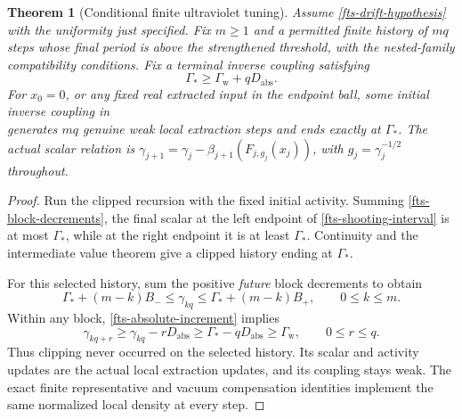 \documentclass[11pt]{article}
\newtheorem{theorem}{Theorem}[section]
\theoremstyle{remark}
\begin{document}
\begin{theorem}[Conditional finite ultraviolet tuning]
\label{fts-theorem}
Assume \eqref{fts-drift-hypothesis} with the uniformity just
specified. Fix $m\geq1$ and a permitted finite history of
$mq$ steps whose final period is above the strengthened
threshold, with the nested-family compatibility conditions.
Fix a terminal inverse coupling satisfying
\begin{equation}
       \Gamma_*\geq\Gamma_{\mathrm w}+qD_{\mathrm{abs}}.
 \label{fts-terminal-margin}
\end{equation}
For $x_0=0$, or any fixed real extracted input in the
endpoint ball, some initial inverse coupling in
\begin{equation}
       [\,\Gamma_*+mB_-,\ \Gamma_*+mB_+\,]
 \label{fts-shooting-interval}
\end{equation}
generates $mq$ genuine weak local extraction steps and
ends exactly at $\Gamma_*$. The actual scalar relation
is $\gamma_{j+1}=\gamma_j-\beta_{j+1}(F_{j,g_j}(x_j))$,
with $g_j=\gamma_j^{-1/2}$ throughout.
\end{theorem}

\begin{proof}
Run the clipped recursion with the fixed initial activity.
Summing \eqref{fts-block-decrements}, the final scalar
at the left endpoint of \eqref{fts-shooting-interval}
is at most $\Gamma_*$, while at the right endpoint it
is at least $\Gamma_*$. Continuity and the intermediate
value theorem give a clipped history ending at $\Gamma_*$.

For this selected history, sum the positive \emph{future}
block decrements to obtain
\begin{equation}
 \Gamma_*+(m-k)B_-\leq\gamma_{kq}
                   \leq\Gamma_*+(m-k)B_+,
 \qquad 0\leq k\leq m.
 \label{fts-endpoint-bounds}
\end{equation}
Within any block, \eqref{fts-absolute-increment} implies
\begin{equation}
 \gamma_{kq+r}\geq\gamma_{kq}-rD_{\mathrm{abs}}
       \geq\Gamma_*-qD_{\mathrm{abs}}
       \geq\Gamma_{\mathrm w},
 \qquad 0\leq r\leq q.
 \label{fts-no-clipping}
\end{equation}
Thus clipping never occurred on the selected history.
Its scalar and activity updates are the actual local
extraction updates, and its coupling stays weak.
The exact finite representative and vacuum compensation
identities implement the same normalized local density
at every step.
\end{proof}
\end{document}
